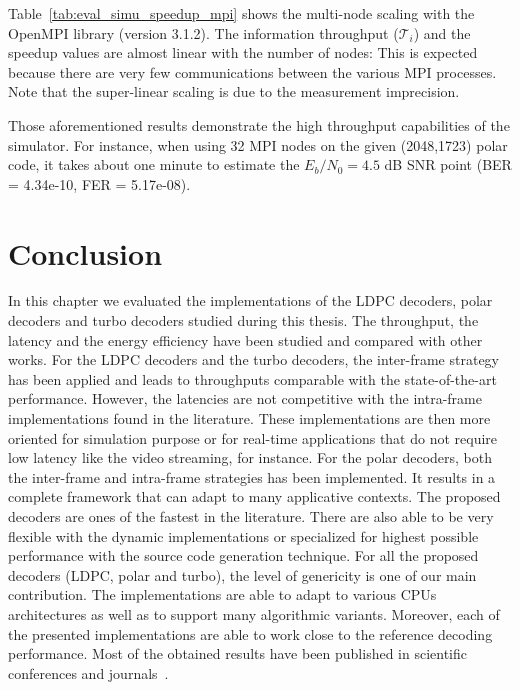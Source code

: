 Table~\ref{tab:eval_simu_speedup_mpi} shows the multi-node scaling with the
OpenMPI library (version 3.1.2). The information throughput ($\mathcal{T}_i$)
and the speedup values are almost linear with the number of nodes: This is
expected because there are very few communications between the various MPI
processes. Note that the super-linear scaling is due to the measurement
imprecision.

Those aforementioned results demonstrate the high throughput
capabilities of the \AFFECT simulator. For instance, when using 32 MPI nodes on
the given (2048,1723) polar code, it takes about one minute to estimate the
$E_b/N_0=4.5$ dB SNR point (BER = 4.34e-10, FER = 5.17e-08).

\section{Conclusion}

In this chapter we evaluated the implementations of the LDPC decoders, polar
decoders and turbo decoders studied during this thesis. The throughput, the
latency and the energy efficiency have been studied and compared with other
works. For the LDPC decoders and the turbo decoders, the inter-frame strategy
has been applied and leads to throughputs comparable with the state-of-the-art
performance. However, the latencies are not competitive with the intra-frame
implementations found in the literature. These implementations are then more
oriented for simulation purpose or for real-time applications that do not
require low latency like the video streaming, for instance. For the polar
decoders, both the inter-frame and intra-frame strategies has been implemented.
It results in a complete framework that can adapt to many applicative contexts.
The proposed decoders are ones of the fastest in the literature. There are also
able to be very flexible with the dynamic implementations or specialized for
highest possible performance with the source code generation technique. For all
the proposed decoders (LDPC, polar and turbo), the level of genericity is one of
our main contribution. The implementations are able to adapt to various CPUs
architectures as well as to support many algorithmic variants. Moreover, each of
the presented implementations are able to work close to the reference decoding
performance. Most of the obtained results have been published in scientific
conferences and journals~\cite{Ghaffari2019,Leonardon2019,Cassagne2015c,
Cassagne2016b,Cassagne2016a}.

